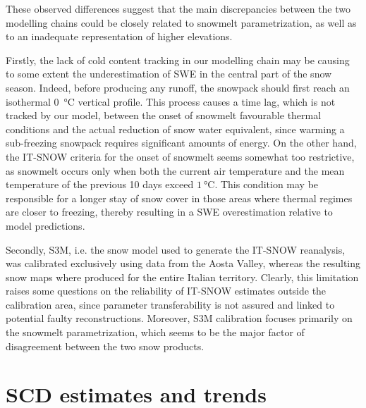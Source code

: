 These observed differences suggest that the main discrepancies between the two modelling chains could be closely related to snowmelt parametrization, as well as 
to an inadequate representation of higher elevations. 

Firstly, the lack of cold content tracking in our modelling chain may be causing to some extent the 
underestimation of SWE in the central part of the snow season. Indeed, before producing any runoff, the snowpack should first reach an isothermal 
\SI{0}{\degreeCelsius} vertical profile. This process causes a time lag, which is not tracked by our model, between the onset of snowmelt favourable 
thermal conditions and the actual reduction of snow water equivalent, since warming a sub-freezing snowpack requires significant amounts of energy. 
On the other hand, the IT-SNOW criteria for the onset of snowmelt seems somewhat too restrictive, as snowmelt occurs only when both the current air 
temperature and the mean temperature of the previous 10 days exceed $\SI{1}{\degreeCelsius}$. This condition may be responsible for a longer stay of 
snow cover in those areas where thermal regimes are closer to freezing, thereby resulting in a SWE overestimation relative to model predictions. 

Secondly, S3M, i.e. the snow model used to generate the IT-SNOW reanalysis, was calibrated exclusively using data from the Aosta Valley, whereas the 
resulting snow maps where produced for the entire Italian territory. Clearly, this limitation raises some questions on the reliability of IT-SNOW 
estimates outside the calibration area, since parameter transferability is not assured and linked to potential faulty reconstructions. Moreover, S3M 
calibration focuses primarily on the snowmelt parametrization, which seems to be the major factor of disagreement between the two snow products.








\section{SCD estimates and trends}

